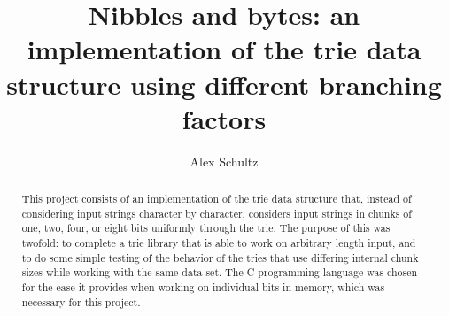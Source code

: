 \documentclass{llncs}
\title{Nibbles and bytes: an implementation of the trie data structure using different branching factors}
\author{Alex Schultz}
\institute{Tufts University}
\begin{document}
\maketitle

\begin{abstract}
This project consists of an implementation of the trie data structure that, instead of considering input strings character by character, considers input strings in chunks of one, two, four, or eight bits uniformly through the trie. The purpose of this was twofold: to complete a trie library that is able to work on arbitrary length input, and to do some simple testing of the behavior of the tries that use differing internal chunk sizes while working with the same data set. The C programming language was chosen for the ease it provides when working on individual bits in memory, which was necessary for this project.
\end{abstract}
\end{document}

